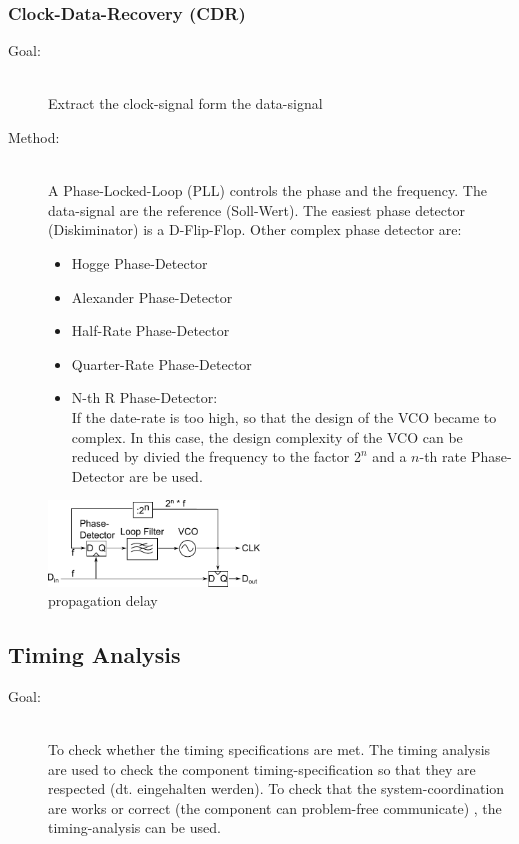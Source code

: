 \subsubsection{Clock-Data-Recovery (CDR)}
\begin{description}
	\item [Goal:] \hfill \\
		 Extract the clock-signal form the data-signal
	\item [Method:] \hfill \\
		 A Phase-Locked-Loop (PLL) controls the phase and the frequency. The data-signal are the reference (Soll-Wert). The easiest phase detector (Diskiminator) is a D-Flip-Flop. Other complex phase detector are:
		\begin{itemize}
			\item Hogge Phase-Detector
			\item Alexander Phase-Detector
			\item Half-Rate Phase-Detector
			\item Quarter-Rate Phase-Detector
			\item N-th R Phase-Detector:\\
				If the date-rate is too high, so that the design of the VCO became to complex. In this case, the design complexity of the VCO can be reduced by divied the frequency to the factor $2^n$ and a $n$-th rate Phase-Detector are be used. 
		\end{itemize}
\end{description}
\begin{figure}[h]
	\centering
	\includegraphics[width=0.5\textwidth]{images/High_Speed_Digital/PLL.pdf}
	\caption{propagation delay}
\end{figure}


\subsection{Timing Analysis}
\begin{description}
	\item[Goal:] \hfill \\
		To check whether the timing specifications are met. The timing analysis are used to check the component timing-specification so that they are respected (dt. eingehalten werden). To check that the system-coordination are works or correct (the component can problem-free communicate) , the timing-analysis can be used.
\end{description}

